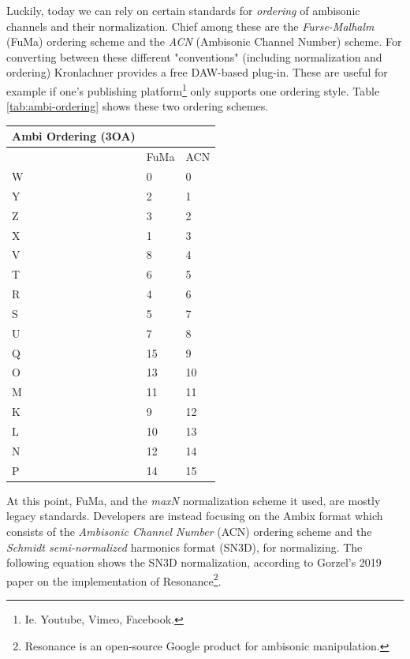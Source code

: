 Luckily, today we can rely on certain standards for \textit{ordering} of ambisonic channels and their normalization. Chief among these are the \textit{Furse-Malhalm} (FuMa) ordering scheme and the \textit{ACN} (Ambisonic Channel Number) scheme. For converting between these different "conventions" (including normalization and ordering) Kronlachner \cite{kronlachner2014plug} provides a free DAW-based plug-in. These are useful for example if one's publishing platform\footnote{Ie. Youtube, Vimeo, Facebook.} only supports one ordering style. Table \ref{tab:ambi-ordering} shows these two ordering schemes. 


\begin{center}
    \begin{tabular}{ | l | l | l | }
    \hline
	Ambi Ordering (3OA) &  &  \\ \hline
	 & FuMa & ACN \\ \hline
	W & 0 & 0 \\ \hline
	Y & 2 & 1 \\ \hline
	Z & 3 & 2 \\ \hline
	X & 1 & 3 \\ \hline
	V & 8 & 4 \\ \hline
	T & 6 & 5 \\ \hline
	R & 4 & 6 \\ \hline
	S & 5 & 7 \\ \hline
	U & 7 & 8 \\ \hline
	Q & 15 & 9 \\ \hline
	O & 13 & 10 \\ \hline
	M & 11 & 11 \\ \hline
	K & 9 & 12 \\ \hline
	L & 10 & 13 \\ \hline
	N & 12 & 14 \\ \hline
	P & 14 & 15 \\ \hline
    \end{tabular}
    \label{tab:ambi-ordering}
\end{center}

At this point, FuMa, and the \textit{maxN} normalization scheme it used, are mostly legacy standards. Developers are instead focusing on the Ambix format which consists of the \textit{Ambisonic Channel Number} (ACN) ordering scheme and the \textit{Schmidt semi-normalized} harmonics format (SN3D), for normalizing. The following equation shows the SN3D normalization, according to Gorzel's 2019 \cite{gorzel2019efficient} paper on the implementation of Resonance\footnote{Resonance is an open-source Google product for ambisonic manipulation.}. 

